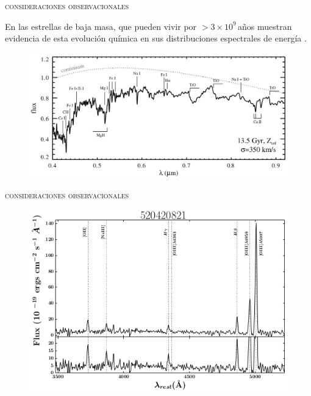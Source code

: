 \documentclass[xcolor=dvipsnames,4pt,hyperref={colorlinks,citecolor=black,linkcolor=black,urlcolor=black}]{beamer}
\begin{document}
\begin{frame}{\textsc{consideraciones observacionales}}

En las estrellas de baja masa, que pueden vivir por $>3\times10^9\,$años muestran evidencia de esta
evolución química en sus distribuciones espectrales de energía \citep{Conroy2014}.
\begin{figure}
\includegraphics[scale=0.6]{img/conroy2014-1}
\end{figure}
\end{frame}

\begin{frame}{\textsc{consideraciones observacionales}}

\begin{figure}
\includegraphics[scale=1]{img/calabro2017-2}
\end{figure}
\end{frame}
\end{document}
